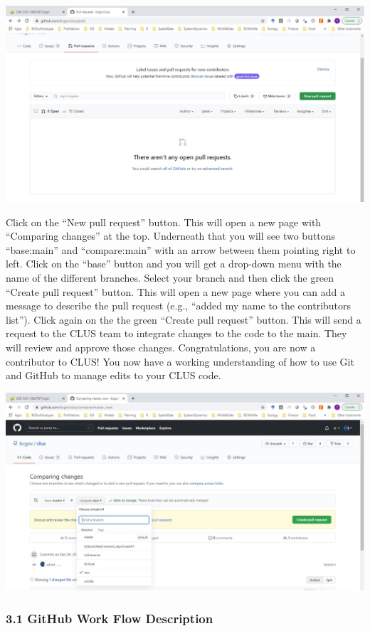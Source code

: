 \documentclass[
]{article}
\begin{document}
\includegraphics{images/github_pull1.jpg}

Click on the ``New pull request'' button. This will open a new page with
``Comparing changes'' at the top. Underneath that you will see two
buttons ``base:main'' and ``compare:main'' with an arrow between them
pointing right to left. Click on the ``base'' button and you will get a
drop-down menu with the name of the different branches. Select your
branch and then click the green ``Create pull request'' button. This
will open a new page where you can add a message to describe the pull
request (e.g., ``added my name to the contributors list''). Click again
on the the green ``Create pull request'' button. This will send a
request to the CLUS team to integrate changes to the code to the main.
They will review and approve those changes. Congratulations, you are now
a contributor to CLUS! You now have a working understanding of how to
use Git and GitHub to manage edits to your CLUS code.

\includegraphics{images/github_pull2.jpg}

\hypertarget{github-work-flow-description}{%
\subsubsection{3.1 GitHub Work Flow
Description}\label{github-work-flow-description}}
\end{document}

